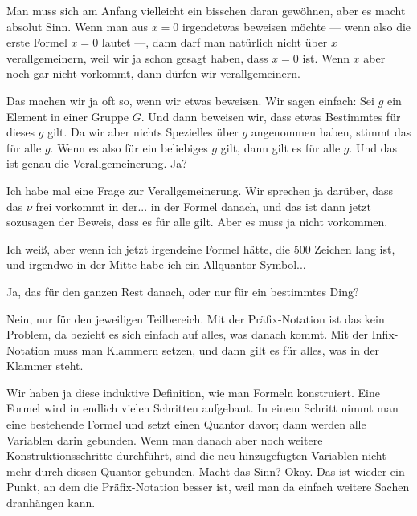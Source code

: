 \begin{spoken-clean}[00:25:54 - 00:26:45]
Man muss sich am Anfang vielleicht ein bisschen daran gewöhnen, aber es macht absolut Sinn. Wenn man aus $x=0$ irgendetwas beweisen möchte --- wenn also die erste Formel $x=0$ lautet ---, dann darf man natürlich nicht über $x$ verallgemeinern, weil wir ja schon gesagt haben, dass $x=0$ ist. Wenn $x$ aber noch gar nicht vorkommt, dann dürfen wir verallgemeinern. 

Das machen wir ja oft so, wenn wir etwas beweisen. Wir sagen einfach: Sei $g$ ein Element in einer Gruppe $G$. Und dann beweisen wir, dass etwas Bestimmtes für dieses $g$ gilt. Da wir aber nichts Spezielles über $g$ angenommen haben, stimmt das für alle $g$. Wenn es also für ein beliebiges $g$ gilt, dann gilt es für alle $g$. Und das ist genau die Verallgemeinerung. Ja?
\end{spoken-clean}

\begin{student-interaction}
Ich habe mal eine Frage zur Verallgemeinerung. Wir sprechen ja darüber, dass das $\nu$ frei vorkommt in der... in der Formel danach, und das ist dann jetzt sozusagen der Beweis, dass es für alle gilt. Aber es muss ja nicht vorkommen.
\end{student-interaction}

\begin{spoken-clean}[00:27:06 - 00:27:30]
Ich weiß, aber wenn ich jetzt irgendeine Formel hätte, die 500 Zeichen lang ist, und irgendwo in der Mitte habe ich ein Allquantor-Symbol... 
\end{spoken-clean}

\begin{student-interaction}[Studentenfrage]
Ja, das für den ganzen Rest danach, oder nur für ein bestimmtes Ding?
\end{student-interaction}

\begin{spoken-clean}[00:27:30 - 00:28:22]
Nein, nur für den jeweiligen Teilbereich. Mit der Präfix-Notation ist das kein Problem, da bezieht es sich einfach auf alles, was danach kommt. Mit der Infix-Notation muss man Klammern setzen, und dann gilt es für alles, was in der Klammer steht.

Wir haben ja diese induktive Definition, wie man Formeln konstruiert. Eine Formel wird in endlich vielen Schritten aufgebaut. In einem Schritt nimmt man eine bestehende Formel und setzt einen Quantor davor; dann werden alle Variablen darin gebunden. Wenn man danach aber noch weitere Konstruktionsschritte durchführt, sind die neu hinzugefügten Variablen nicht mehr durch diesen Quantor gebunden. Macht das Sinn? Okay. Das ist wieder ein Punkt, an dem die Präfix-Notation besser ist, weil man da einfach weitere Sachen dranhängen kann.
\end{spoken-clean}

